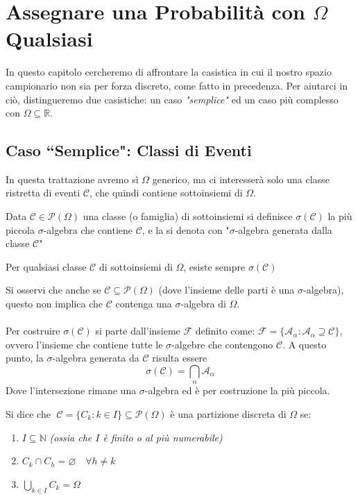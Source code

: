 \chapter{Assegnare una Probabilità con $\Omega$ Qualsiasi}
In questo capitolo cercheremo di affrontare la casistica in cui il nostro spazio campionario non sia per forza discreto, come fatto in precedenza. Per aiutarci in ciò, distingueremo due casistiche: un caso \textit{"semplice"} ed un caso più complesso con $\Omega \subseteq \mathbb{R}$.
\section{Caso ``Semplice": Classi di Eventi}\label{sec:caso-semplice}
In questa trattazione avremo sì $\Omega$ generico, ma ci interesserà solo una classe ristretta di eventi $\mathcal{C}$, che quindi contiene sottoinsiemi di $\Omega$.
\begin{definizione}
    Data $\mathcal{C}\in \mathcal{P}(\Omega)$ una classe (o famiglia) di sottoinsiemi si definisce $\sigma(\mathcal{C})$ la più piccola $\sigma$-algebra che contiene $\mathcal{C}$, e la si denota con "$\sigma$-algebra generata dalla classe $\mathcal{C}$"
\end{definizione}
\begin{proposizione}
    Per qualsiasi classe $\mathcal{C}$ di sottoinsiemi di $\Omega$, esiste sempre $\sigma(\mathcal{C})$
\end{proposizione}

Si osservi che anche se $\mathcal{C} \subseteq \mathcal{P}(\Omega)$ (dove l'insieme delle parti è una $\sigma$-algebra), questo non implica che $\mathcal{C}$ contenga una $\sigma$-algebra di $\Omega$.\\
\\
Per costruire $\sigma(\mathcal{C})$ si parte dall'insieme $\mathcal{F}$ definito come: $\mathcal{F} = \{\mathcal{A}_\alpha: \mathcal{A}_\alpha\supseteq\mathcal{C}\}$, ovvero l'insieme che contiene tutte le $\sigma$-algebre che contengono $\mathcal{C}$. A questo punto, la $\sigma$-algebra generata da $\mathcal{C}$ risulta essere
\[\sigma(\mathcal{C}) = \bigcap_\alpha \mathcal{A}_\alpha\]
Dove l'intersezione rimane una $\sigma$-algebra ed è per costruzione la più piccola.
\begin{definizione}
    Si dice che $\;\mathcal{C} = \{C_k: k\in I\}\subseteq \mathcal{P}(\Omega)$ è una partizione discreta di $\Omega$ se:
    \begin{enumerate}
        \item $I\subseteq\mathbb{N}$ \hfill \textit{(ossia che $I$ è finito o al più numerabile)}
        \item $C_k \cap C_h = \varnothing \quad \forall h\neq k$
        \item $\bigcup_{k\in I} C_k = \Omega$
    \end{enumerate}
\end{definizione}

